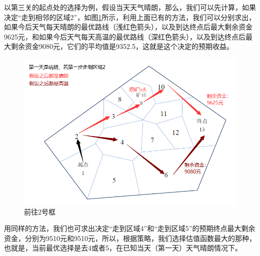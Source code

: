 \documentclass[withoutpreface,bwprint]{cumcmthesis} %
\begin{document}
以第三关的起点处的选择为例，假设当天天气晴朗，那么，我们可以先计算，如果决定“走到相邻的区域2”，如图\ref{gate3-1}所示，利用上面已有的方法，我们可以分别求出，如果今后天气每天晴朗的最优路线（浅红色箭头），以及到达终点后最大剩余资金9625元，和如果今后天气每天高温的最优路线（深红色箭头），以及到达终点后最大剩余资金9080元，它们的平均值是9352.5，这就是这个决定的预期收益。

\begin{figure}
    \centering
    \includegraphics[width=.8\textwidth]{figures/gate3-1.png}
    \caption{前往2号框}
    \label{gate3-1}
\end{figure}

用同样的方法，我们也可求出决定“走到区域4”和“走到区域5”的预期终点最大剩余资金，分别为9510元和9510元，所以，根据策略，我们选择估值函数最大的那种，也就是，当前最优选择是去4或者5，在已知当天（第一天）天气晴朗情况下。
\end{document}
